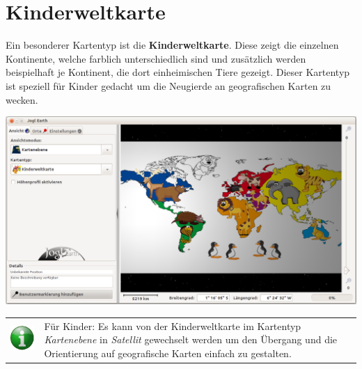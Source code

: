 \documentclass[10pt]{scrreprt}
\newcommand{\textref}[1]{\mbox{\raisebox{0.1ex}{\small$\rightarrow$ }\textit{#1}}}
\begin{document}
\vspace{5mm}
\section{Kinderweltkarte}  
Ein besonderer Kartentyp ist die \textbf{Kinderweltkarte}. Diese zeigt die einzelnen Kontinente, welche farblich unterschiedlich sind und zusätzlich werden beispielhaft je Kontinent, die dort einheimischen Tiere gezeigt. Dieser Kartentyp ist speziell für Kinder gedacht um die Neugierde an geografischen Karten zu wecken.

\vspace{3mm}
\begin{center}
\includegraphics[scale=0.25]{images/flacheKarte_Kinderweltkarte.png}
\end{center}

\vspace{3mm}
\begin{tabular}{>{\centering \arraybackslash}m{1cm} m{14cm}}
\includegraphics[scale=0.5]{images/info.eps} &  Für Kinder: Es kann von der Kinderweltkarte im Kartentyp \textref{Kartenebene} in \textref{Satellit} gewechselt werden um den Übergang und die Orientierung auf geografische Karten einfach zu gestalten.
\end{tabular}



\newpage
\end{document}
